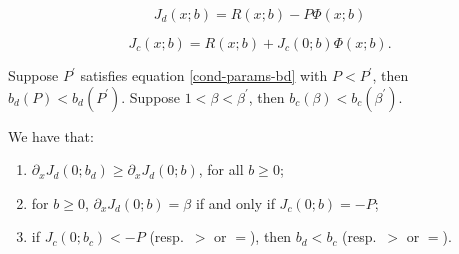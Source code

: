 \documentclass[10pt,a4paper]{amsart}
\newcommand{\delx}{\partial_x}
\renewcommand{\geq}{\geqslant}
\begin{document}
\begin{equation}\label{Jd-compact}
J_d(x;b) = R(x;b) - P\Phi(x;b)
\end{equation}

\begin{equation}\label{Jc-compact}
    J_c(x;b) = R(x;b) + J_c(0;b)\Phi(x;b) .
\end{equation}

\begin{proposition}\label{prop:seuils-croiss}
    Suppose  $P^\prime$ satisfies equation \eqref{cond-params-bd} with $P<P^\prime$, then $b_d(P)<b_d(P^\prime)$. Suppose $1< \beta < \beta^\prime$, then $b_c(\beta)<b_c(\beta^\prime)$.
\end{proposition}

\begin{lemma}\label{lem-delxJd}
    We have that:
    \begin{enumerate}
        \item $\delx J_d(0;b_d) \geq \delx J_d(0;b)$, for all $b\geq 0$;
        \item for $b\geq 0$, $\delx J_d(0;b) =\beta$ if and only if $J_c(0;b) = -P$;
        \item if $J_c(0;b_c) < -P$ (resp.\ $>$ or $=$), then $b_d < b_c$ (resp.\ $>$ or $=$).
    \end{enumerate}
\end{lemma}
\end{document}
